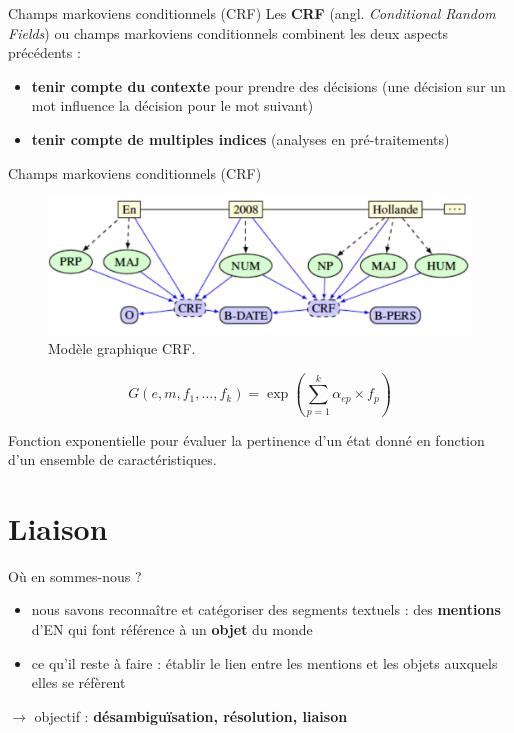 \documentclass[xetex,xcolor={table,usenames,dvipsnames}]{beamer}
\newcommand{\bolder}[1]{{\color{purple}\bfseries#1}}
\begin{document}
\begin{frame}{Champs markoviens conditionnels (\textsc{CRF})}
	Les \bolder{\textsc{CRF}} (angl. \textit{Conditional Random Fields}) ou champs markoviens conditionnels combinent les deux aspects précédents : 
	\begin{itemize}
		\item \textcolor{deepblue}{\textbf{tenir compte du contexte}} pour prendre des décisions (une décision sur un mot influence la décision pour le mot suivant)
		\item \textcolor{deepblue}{\textbf{tenir compte de multiples indices}} (analyses en pré-traitements)
	\end{itemize}
\end{frame}

\begin{frame}{Champs markoviens conditionnels (\textsc{CRF})}
									\begin{figure}[h] %
		\centering
		\includegraphics[width=.9\linewidth]{img/crf.png}
		\caption{Modèle graphique \textsc{CRF}.}
		\label{fig:ling_out_TAL}
	\end{figure}
	
	\begin{equation*}
			G(e,m,f_{1},\dots,f_{k}) = \exp \left( \sum_{p=1}^{k} \alpha_{ep} \times f_{p} \right)
	\end{equation*}

Fonction exponentielle pour évaluer la pertinence d’un état donné en fonction d’un ensemble de caractéristiques.
	
\end{frame}

\section{Liaison}

\begin{frame}{Où en sommes-nous ?}
	\begin{itemize}
		\item nous savons reconnaître et catégoriser des segments textuels : des \textcolor{deepblue}{\textbf{mentions}} d'\textsc{EN} qui font référence à un \textcolor{deepblue}{\textbf{objet}} du monde
		\item ce qu'il reste à faire : établir le lien entre les mentions et les objets auxquels elles se réfèrent
	\end{itemize}
	
	$\rightarrow$ objectif : \bolder{désambiguïsation, résolution, liaison}
\end{frame}
\end{document}
